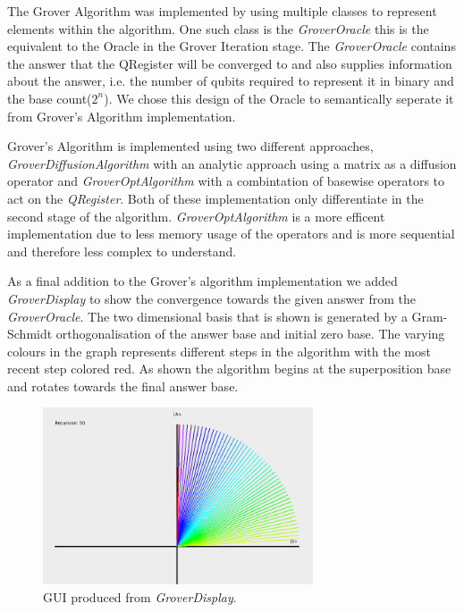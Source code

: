 The Grover Algorithm was implemented by using multiple classes to represent elements within the algorithm. One such class is the \emph{GroverOracle} this is the equivalent to the Oracle in the Grover Iteration stage. The \emph{GroverOracle} contains the answer that the QRegister will be converged to and also supplies information about the answer, i.e. the number of qubits required to represent it in binary and the base count(\(2^n\)). We chose this design of the Oracle to semantically seperate it from Grover's Algorithm implementation.

Grover's Algorithm is implemented using two different approaches, \emph{GroverDiffusionAlgorithm} with an analytic approach using a matrix as a diffusion operator\cite{solca2008} and \emph{GroverOptAlgorithm} with a combintation of basewise operators to act on the \emph{QRegister}. Both of these implementation only differentiate in the second stage of the algorithm. \emph{GroverOptAlgorithm} is a more efficent implementation due to less memory usage of the operators and is more sequential and therefore less complex to understand.

As a final addition to the Grover's algorithm implementation we added \emph{GroverDisplay} to show the convergence towards the given answer from the \emph{GroverOracle}. The two dimensional basis that is shown is generated by a Gram-Schmidt orthogonalisation of the answer base and initial zero base. The varying colours in the graph represents different steps in the algorithm with the most recent step colored red. As shown the algorithm begins at the superposition base and rotates towards the final answer base.

\begin{figure}[H]
	\centering
	\includegraphics[width=80mm]{./images/GUI}
	\caption{GUI produced from \emph{GroverDisplay}. }
\end{figure}
